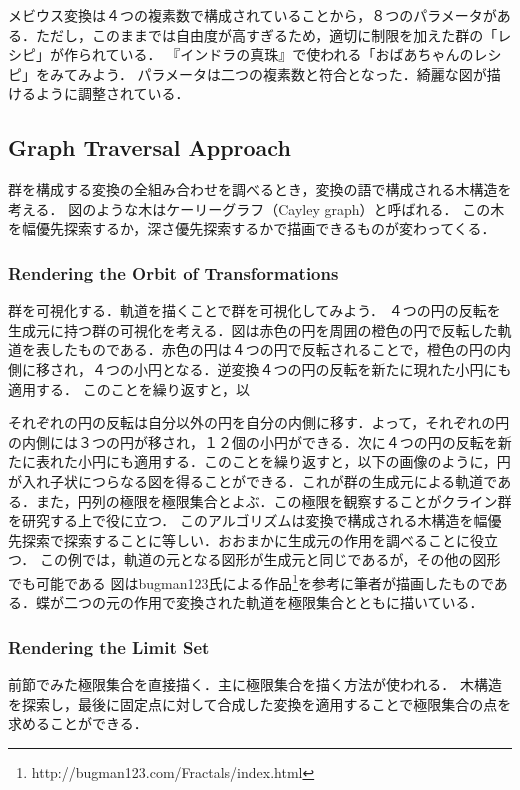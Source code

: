 メビウス変換は４つの複素数で構成されていることから，８つのパラメータがある．ただし，このままでは自由度が高すぎるため，適切に制限を加えた群の「レシピ」が作られている．
『インドラの真珠』で使われる「おばあちゃんのレシピ」をみてみよう．
パラメータは二つの複素数と符合となった．綺麗な図が描けるように調整されている．

\subsection{Graph Traversal Approach}

群を構成する変換の全組み合わせを調べるとき，変換の語で構成される木構造を考える．
図のような木はケーリーグラフ（Cayley graph）と呼ばれる．
この木を幅優先探索するか，深さ優先探索するかで描画できるものが変わってくる．

\subsubsection{Rendering the Orbit of Transformations}
群を可視化する．軌道を描くことで群を可視化してみよう．
４つの円の反転を生成元に持つ群の可視化を考える．図は赤色の円を周囲の橙色の円で反転した軌道を表したものである．赤色の円は４つの円で反転されることで，橙色の円の内側に移され，４つの小円となる．逆変換４つの円の反転を新たに現れた小円にも適用する．
このことを繰り返すと，以

それぞれの円の反転は自分以外の円を自分の内側に移す．よって，それぞれの円の内側には３つの円が移され，１２個の小円ができる．次に４つの円の反転を新たに表れた小円にも適用する．このことを繰り返すと，以下の画像のように，円が入れ子状につらなる図を得ることができる．これが群の生成元による軌道である．また，円列の極限を極限集合とよぶ．この極限を観察することがクライン群を研究する上で役に立つ．
このアルゴリズムは変換で構成される木構造を幅優先探索で探索することに等しい．おおまかに生成元の作用を調べることに役立つ．
この例では，軌道の元となる図形が生成元と同じであるが，その他の図形でも可能である
図はbugman123氏による作品\footnote{http://bugman123.com/Fractals/index.html}を参考に筆者が描画したものである．蝶が二つの元の作用で変換された軌道を極限集合とともに描いている．

\subsubsection{Rendering the Limit Set}
前節でみた極限集合を直接描く．主に極限集合を描く方法が使われる．
木構造を探索し，最後に固定点に対して合成した変換を適用することで極限集合の点を求めることができる．

